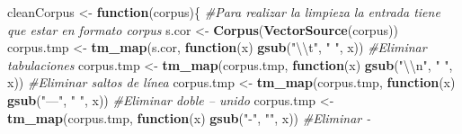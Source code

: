 \documentclass[
]{article}
\newenvironment{Shaded}{\begin{snugshade}}{\end{snugshade}}
\newcommand{\CharTok}[1]{\textcolor[rgb]{0.31,0.60,0.02}{#1}}
\newcommand{\CommentTok}[1]{\textcolor[rgb]{0.56,0.35,0.01}{\textit{#1}}}
\newcommand{\ControlFlowTok}[1]{\textcolor[rgb]{0.13,0.29,0.53}{\textbf{#1}}}
\newcommand{\KeywordTok}[1]{\textcolor[rgb]{0.13,0.29,0.53}{\textbf{#1}}}
\newcommand{\NormalTok}[1]{#1}
\newcommand{\StringTok}[1]{\textcolor[rgb]{0.31,0.60,0.02}{#1}}
\begin{document}
\begin{Shaded}
\begin{Highlighting}[]
\NormalTok{cleanCorpus <-}\StringTok{ }\ControlFlowTok{function}\NormalTok{(corpus)\{}
  \CommentTok{#Para realizar la limpieza la entrada tiene que estar en formato corpus}
\NormalTok{  s.cor <-}\StringTok{ }\KeywordTok{Corpus}\NormalTok{(}\KeywordTok{VectorSource}\NormalTok{(corpus))}
\NormalTok{  corpus.tmp <-}\StringTok{ }\KeywordTok{tm_map}\NormalTok{(s.cor, }\ControlFlowTok{function}\NormalTok{(x) }\KeywordTok{gsub}\NormalTok{(}\StringTok{"}\CharTok{\textbackslash{}\textbackslash{}}\StringTok{t"}\NormalTok{, }\StringTok{" "}\NormalTok{, x)) }\CommentTok{#Eliminar tabulaciones}
\NormalTok{  corpus.tmp <-}\StringTok{ }\KeywordTok{tm_map}\NormalTok{(corpus.tmp, }\ControlFlowTok{function}\NormalTok{(x) }\KeywordTok{gsub}\NormalTok{(}\StringTok{"}\CharTok{\textbackslash{}\textbackslash{}}\StringTok{n"}\NormalTok{, }\StringTok{" "}\NormalTok{, x)) }\CommentTok{#Eliminar saltos de línea}
\NormalTok{  corpus.tmp <-}\StringTok{ }\KeywordTok{tm_map}\NormalTok{(corpus.tmp, }\ControlFlowTok{function}\NormalTok{(x) }\KeywordTok{gsub}\NormalTok{(}\StringTok{"—"}\NormalTok{, }\StringTok{" "}\NormalTok{, x)) }\CommentTok{#Eliminar doble -- unido}
\NormalTok{  corpus.tmp <-}\StringTok{ }\KeywordTok{tm_map}\NormalTok{(corpus.tmp, }\ControlFlowTok{function}\NormalTok{(x) }\KeywordTok{gsub}\NormalTok{(}\StringTok{"-"}\NormalTok{, }\StringTok{""}\NormalTok{, x)) }\CommentTok{#Eliminar  -}


\end{Highlighting}
\end{Shaded}
\end{document}
